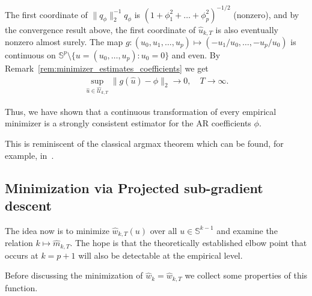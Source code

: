 The first coordinate of $\|q_{\phi}\|_2^{-1}q_{\phi}$ is $(1+\phi_1^2+\dots+\phi_p^2)^{-1/2}$ (nonzero), and by the convergence result above, the first coordinate of $\hat{u}_{k,T}$ is also eventually nonzero almost surely. The map $g:(u_0,u_1,\dots,u_p)\mapsto(-u_1/u_0,\dots,-u_p/u_0)$ is continuous on $\mathbb{S}^{p}\setminus\{u=(u_0,\dots,u_p):u_0=0\}$ and even. By Remark~\ref{rem:minimizer_estimates_coefficients} we get
\begin{align*}
    \sup_{\hat{u}\in\hat{\mathcal{U}}_{k,T}}\|g(\hat{u})-\phi\|_2\to0,\quad T\to\infty.
\end{align*}

Thus, we have shown that a continuous transformation of every empirical minimizer is a strongly consistent estimator for the AR coefficients $\phi$.

This is reminiscent of the classical argmax theorem which can be found, for example, in~\cite{Vaart_1998}.

\subsection{Minimization via Projected sub-gradient descent}

The idea now is to minimize $\hat{w}_{k,T}(u)$ over all $u\in\mathbb{S}^{k-1}$ and examine the relation $k\mapsto \hat{m}_{k,T}$. The hope is that the theoretically established elbow point that occurs at $k=p+1$ will also be detectable at the empirical level.

Before discussing the minimization of $\hat{w}_k=\hat{w}_{k,T}$ we collect some properties of this function.

